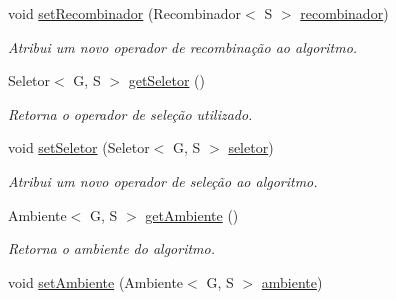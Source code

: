 \begin{DoxyCompactItemize}
void \hyperlink{classic_1_1populacional_1_1algoritmo_1_1_algoritmo_evolucionario_3_01_g_01extends_01_number_00_0bd52af860edf752f8985460efb0aa102_a3294985c0b68bc7d20a8d77e932e15ee}{set\-Recombinador} (Recombinador$<$ S $>$ \hyperlink{classic_1_1populacional_1_1algoritmo_1_1_algoritmo_evolucionario_3_01_g_01extends_01_number_00_0bd52af860edf752f8985460efb0aa102_ac838e8a3de3ba4b8b6fdebe52a69f469}{recombinador})
\begin{DoxyCompactList}\small\item\em Atribui um novo operador de recombinação ao algoritmo. \end{DoxyCompactList}\item 
Seletor$<$ G, S $>$ \hyperlink{classic_1_1populacional_1_1algoritmo_1_1_algoritmo_evolucionario_3_01_g_01extends_01_number_00_0bd52af860edf752f8985460efb0aa102_a5604ffc490a28d4f9f102261d4627e6b}{get\-Seletor} ()
\begin{DoxyCompactList}\small\item\em Retorna o operador de seleção utilizado. \end{DoxyCompactList}\item 
void \hyperlink{classic_1_1populacional_1_1algoritmo_1_1_algoritmo_evolucionario_3_01_g_01extends_01_number_00_0bd52af860edf752f8985460efb0aa102_a645a1c47dea80d12448a9be02a2504dd}{set\-Seletor} (Seletor$<$ G, S $>$ \hyperlink{classic_1_1populacional_1_1algoritmo_1_1_algoritmo_evolucionario_3_01_g_01extends_01_number_00_0bd52af860edf752f8985460efb0aa102_a85f70421ade3860f457d57714efed9f0}{seletor})
\begin{DoxyCompactList}\small\item\em Atribui um novo operador de seleção ao algoritmo. \end{DoxyCompactList}\item 
Ambiente$<$ G, S $>$ \hyperlink{classic_1_1populacional_1_1algoritmo_1_1_algoritmo_evolucionario_3_01_g_01extends_01_number_00_0bd52af860edf752f8985460efb0aa102_aaf27d8a82518b621ad47d20ef611eb49}{get\-Ambiente} ()
\begin{DoxyCompactList}\small\item\em Retorna o ambiente do algoritmo. \end{DoxyCompactList}\item 
void \hyperlink{classic_1_1populacional_1_1algoritmo_1_1_algoritmo_evolucionario_3_01_g_01extends_01_number_00_0bd52af860edf752f8985460efb0aa102_a9b7ac1c107c13b4e9d8023cedaec2e06}{set\-Ambiente} (Ambiente$<$ G, S $>$ \hyperlink{classic_1_1populacional_1_1algoritmo_1_1_algoritmo_evolucionario_3_01_g_01extends_01_number_00_0bd52af860edf752f8985460efb0aa102_ad149586d38a1ad23204c414710203988}{ambiente})

\end{DoxyCompactItemize}
